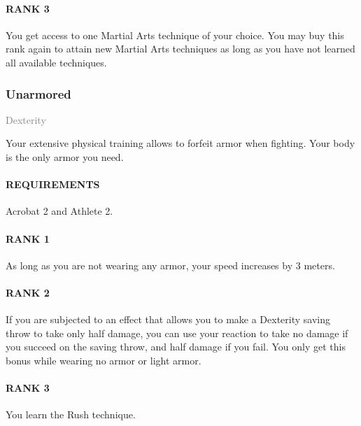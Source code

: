 \paragraph{RANK 3} You get access to one Martial Arts technique of your choice.
You may buy this rank again to attain new Martial Arts techniques as long as you have not learned all available techniques.

\subsubsection{Unarmored} \label{feat::unarmored}
\small{\textcolor{gray}{Dexterity}}

\normalsize
Your extensive physical training allows to forfeit armor when fighting.
Your body is the only armor you need.
\paragraph{REQUIREMENTS} Acrobat 2 and Athlete 2.
\paragraph{RANK 1} As long as you are not wearing any armor, your speed increases by 3 meters.
\paragraph{RANK 2} If you are subjected to an effect that allows you to make a Dexterity saving throw to take only half damage, you can use your reaction to take no damage if you succeed on the saving throw, and half damage if you fail.
You only get this bonus while wearing no armor or light armor.
\paragraph{RANK 3} You learn the Rush technique.

